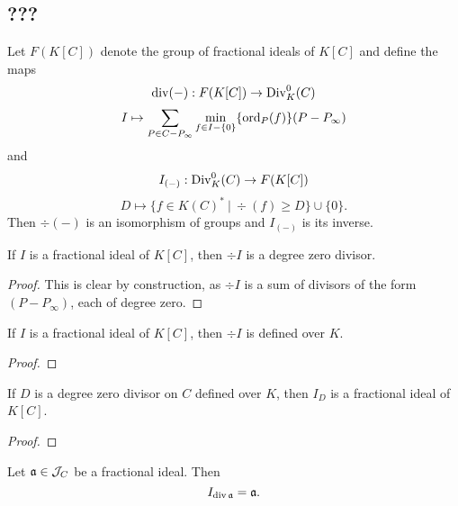 
\subsection{???}

\begin{theorem}
  Let $F(K[C])$ denote the group of fractional ideals of $K[C]$ and define the maps
  \[ \div(-) : F(K[C]) \to \Div_K^0(C) \]
  \[ I \mapsto \sum_{P \in C - P_\infty} \min_{f \in I - \{0\}}\{\ord_P(f)\}(P - P_\infty) \]
  and
  \[ I_{(-)} : \Div_K^0(C) \to F(K[C]) \]
  \[ D \mapsto \{ f \in K(C)^* ~|~ \div(f) \geq D \} \cup \{ 0 \}. \]
  Then $\div(-)$ is an isomorphism of groups and $I_{(-)}$ is its inverse.
\end{theorem}
\begin{lemma}
  If $I$ is a fractional ideal of $K[C]$, then $\div I$ is a degree zero divisor.
\end{lemma}
\begin{proof}
  This is clear by construction,
  as $\div I$ is a sum of divisors of the form $(P - P_\infty)$,
  each of degree zero.
\end{proof}
\begin{lemma}
  If $I$ is a fractional ideal of $K[C]$, then $\div I$ is defined over $K$.
\end{lemma}
\begin{proof}
\end{proof}
\begin{lemma}
  If $D$ is a degree zero divisor on $C$ defined over $K$,
  then $I_D$ is a fractional ideal of $K[C]$.
\end{lemma}
\begin{proof}
\end{proof}
\begin{lemma}
  Let $\frak a \in \cal J_C$ be a fractional ideal. Then
  \[ I_{\div \frak a} = \frak a. \]
\end{lemma}
